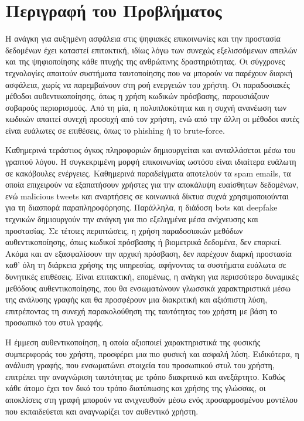 \section{Περιγραφή του Προβλήματος}
\label{section:problem_description}

Η ανάγκη για αυξημένη ασφάλεια στις ψηφιακές επικοινωνίες και την προστασία δεδομένων έχει καταστεί επιτακτική, ιδίως λόγω των συνεχώς εξελισσόμενων απειλών και της ψηφιοποίησης κάθε πτυχής της ανθρώπινης δραστηριότητας. Οι σύγχρονες τεχνολογίες απαιτούν συστήματα ταυτοποίησης που να μπορούν να παρέχουν διαρκή ασφάλεια, χωρίς να παρεμβαίνουν στη ροή ενεργειών του χρήστη. Οι παραδοσιακές μέθοδοι αυθεντικοποίησης, όπως η χρήση κωδικών πρόσβασης, παρουσιάζουν σοβαρούς περιορισμούς. Από τη μία, η πολυπλοκότητα και η συχνή ανανέωση των κωδικών απαιτεί συνεχή προσοχή από τον χρήστη, ενώ από την άλλη οι μέθοδοι αυτές είναι ευάλωτες σε επιθέσεις, όπως το phishing ή το brute-force.

Καθημερινά τεράστιος όγκος πληροφοριών δημιουργείται και ανταλλάσεται μέσω του γραπτού λόγου. Η συγκεκριμένη μορφή επικοινωνίας ωστόσο είναι ιδιαίτερα ευάλωτη σε κακόβουλες ενέργειες. Καθημερινά παραδείγματα αποτελούν τα spam emails, τα οποία επιχειρούν να εξαπατήσουν χρήστες για την αποκάλυψη ευαίσθητων δεδομένων, ενώ malicious tweets και αναρτήσεις σε κοινωνικά δίκτυα συχνά χρησιμοποιούνται για τη διασπορά παραπληροφόρησης. Παράλληλα, η διάδοση bots και deepfake τεχνικών δημιουργούν την ανάγκη για πιο εξελιγμένα μέσα ανίχνευσης και προστασίας. Σε τέτοιες περιπτώσεις, η χρήση παραδοσιακών μεθόδων αυθεντικοποίησης, όπως κωδικοί πρόσβασης ή βιομετρικά δεδομένα, δεν επαρκεί. Ακόμα και αν εξασφαλίσουν την αρχική πρόσβαση, δεν παρέχουν διαρκή προστασία καθ' όλη τη διάρκεια χρήσης της υπηρεσίας, αφήνοντας τα συστήματα ευάλωτα σε δυνητικές επιθέσεις. Είναι επιτακτική, επομένως, η ανάγκη για περισσότερο δυναμικές μεθόδους αυθεντικοποίησης, που θα ενσωματώνουν γλωσσικά χαρακτηριστικά μέσω της ανάλυσης γραφής 
και θα προσφέρουν μια διακριτική και αξιόπιστη λύση, επιτρέποντας τη συνεχή παρακολούθηση της ταυτότητας του χρήστη με βάση το προσωπικό του στυλ γραφής.

Η έμμεση αυθεντικοποίηση, η οποία αξιοποιεί χαρακτηριστικά της φυσικής συμπεριφοράς του χρήστη, προσφέρει μια πιο φυσική και ασφαλή λύση. Ειδικότερα, η ανάλυση γραφής, που ενσωματώνει στοιχεία του προσωπικού στυλ του χρήστη, επιτρέπει την αναγνώριση ταυτότητας με τρόπο διακριτικό και ανεξάρτητο. Καθώς κάθε άτομο έχει τον δικό του τρόπο διατύπωσης και χρήσης της γλώσσας, οι αποκλίσεις στη γραφή μπορούν να ανιχνευθούν μέσω ενός προσαρμοσμένου μοντέλου που εκπαιδεύεται και αναγνωρίζει τον αυθεντικό χρήστη.


